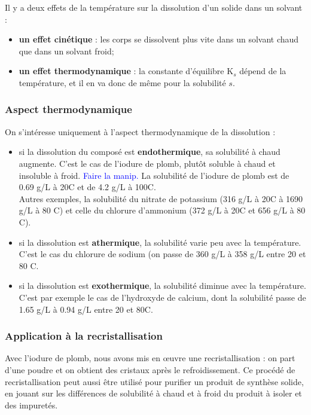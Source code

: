 \documentclass[11pt,a4paper]{report}
\begin{document}
Il y a deux effets de la température sur la dissolution d'un solide dans un solvant :\\
\begin{itemize}
	\item \textbf{un effet cinétique} : les corps se dissolvent plus vite dans un solvant chaud que 		dans un solvant froid;
	\item \textbf{un effet thermodynamique} : la constante d'équilibre $\text{K}_s$ dépend de la 			température, et il en va donc de même pour la solubilité $s$.\\
\end{itemize}

\subsubsection{Aspect thermodynamique}
On s'intéresse uniquement à l'aspect thermodynamique de la dissolution :\\
\begin{itemize}
	\item si la dissolution du composé est \textbf{endothermique}, sa solubilité à chaud augmente. 			C'est le cas de l'iodure de plomb, plutôt soluble à chaud et insoluble à froid. 
		\textcolor{blue}{Faire la manip.} La solubilité de l'iodure de plomb est de 0.69 g/L à 				20\degree C et de 4.2 g/L à 100\degree C.\\
		
		Autres exemples, la solubilité du nitrate de potassium (316 g/L à 20\degree C à 1690 g/L
		à 80 \degree C) et celle du chlorure d'ammonium (372 g/L à 20\degree C et 656 g/L 
		à 80 \degree C).\\
		
	\item si la dissolution est \textbf{athermique}, la solubilité varie peu avec la température. 			C'est le cas du chlorure de sodium (on passe de 360 g/L à 358 g/L entre 20 et 80 
		\degree C.\\
	
	\item si la dissolution est \textbf{exothermique}, la solubilité diminue avec la température. 			C'est par exemple le cas de l'hydroxyde de calcium, dont la solubilité passe de 1.65 g/L à 			0.94 g/L entre 20 et 80\degree C.\\
\end{itemize}

\subsubsection{Application à la recristallisation}
Avec l'iodure de plomb, nous avons mis en œuvre une recristallisation : on part d'une poudre et on obtient des cristaux après le refroidissement. Ce procédé de recristallisation peut aussi être utilisé pour purifier un produit de synthèse solide, en jouant sur les différences de solubilité à chaud et à froid du produit à isoler et des impuretés.\\
\end{document}
